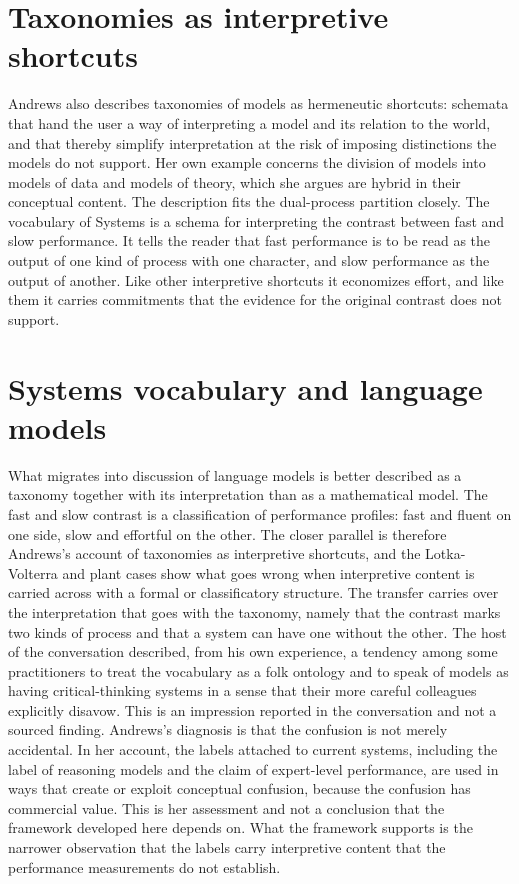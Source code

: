 \documentclass[11pt]{report}
\theoremstyle{remark}
\theoremstyle{definition}
\begin{document}
\section{Taxonomies as interpretive shortcuts}

Andrews also describes taxonomies of models as hermeneutic shortcuts: schemata that hand the user a way of interpreting a model and its relation to the world, and that thereby simplify interpretation at the risk of imposing distinctions the models do not support. Her own example concerns the division of models into models of data and models of theory, which she argues are hybrid in their conceptual content. The description fits the dual-process partition closely. The vocabulary of Systems is a schema for interpreting the contrast between fast and slow performance. It tells the reader that fast performance is to be read as the output of one kind of process with one character, and slow performance as the output of another. Like other interpretive shortcuts it economizes effort, and like them it carries commitments that the evidence for the original contrast does not support.

\section{Systems vocabulary and language models}

What migrates into discussion of language models is better described as a taxonomy together with its interpretation than as a mathematical model. The fast and slow contrast is a classification of performance profiles: fast and fluent on one side, slow and effortful on the other. The closer parallel is therefore Andrews's account of taxonomies as interpretive shortcuts, and the Lotka-Volterra and plant cases show what goes wrong when interpretive content is carried across with a formal or classificatory structure. The transfer carries over the interpretation that goes with the taxonomy, namely that the contrast marks two kinds of process and that a system can have one without the other. The host of the conversation described, from his own experience, a tendency among some practitioners to treat the vocabulary as a folk ontology and to speak of models as having critical-thinking systems in a sense that their more careful colleagues explicitly disavow. This is an impression reported in the conversation and not a sourced finding. Andrews's diagnosis is that the confusion is not merely accidental. In her account, the labels attached to current systems, including the label of reasoning models and the claim of expert-level performance, are used in ways that create or exploit conceptual confusion, because the confusion has commercial value. This is her assessment and not a conclusion that the framework developed here depends on. What the framework supports is the narrower observation that the labels carry interpretive content that the performance measurements do not establish.
\end{document}
